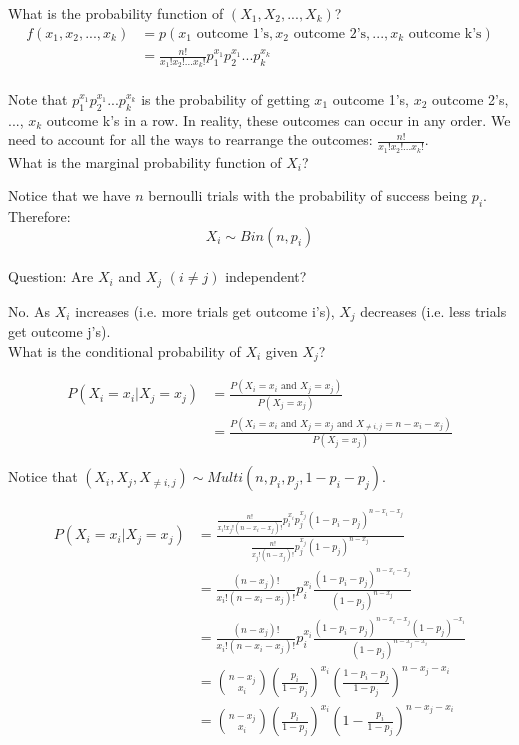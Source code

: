 \documentclass[12pt, letterpaper]{article}
\begin{document}
What is the probability function of $(X_1, X_2, ..., X_k)$?
\begin{align*}
f\left(x_1, x_2, ..., x_k\right) &= p\left(x_1 \text{ outcome 1's}, x_2 \text{ outcome 2's}, ..., x_k \text{ outcome k's}\right)\\
&= \frac{n!}{x_1! x_2! ... x_k!} p_1^{x_1} p_2^{x_1} ... p_k^{x_k}
\end{align*}\\

Note that $p_1^{x_1} p_2^{x_1} ... p_k^{x_k}$ is the probability of getting $x_1$ outcome 1's, $x_2$ outcome 2's, ..., $x_k$ outcome k's in a row. In reality, these outcomes can occur in any order. We need to account for all the ways to rearrange the outcomes: $\frac{n!}{x_1! x_2! ... x_k!}$.\\

What is the marginal probability function of $X_i$?

Notice that we have $n$ bernoulli trials with the probability of success being $p_i$. Therefore:
\begin{equation}
X_i \sim Bin(n, p_i)
\end{equation}\\

Question: Are $X_i$ and $X_j$ $(i \neq j)$ independent?

No. As $X_i$ increases (i.e. more trials get outcome i's), $X_j$ decreases (i.e. less trials get outcome j's).\\

What is the conditional probability of $X_i$ given $X_j$?

\begin{align*}
P\left(X_i = x_i \vert X_j = x_j\right) &= \frac{P\left(X_i = x_i \text{ and } X_j = x_j\right)}{P\left(X_j = x_j\right)}\\
&= \frac{P\left(X_i = x_i \text{ and } X_j = x_j \text{ and } X_{\neq i,j} = n - x_i - x_j\right)}{P\left(X_j = x_j\right)}
\end{align*}

Notice that $(X_i, X_j, X_{\neq i, j}) \sim Multi(n, p_i, p_j, 1 - p_i - p_j)$.

\begin{align*}
P\left(X_i = x_i \vert X_j = x_j\right) &= \frac{\frac{n!}{x_i!x_j!(n - x_i - x_j)!} p_i^{x_i} p_j^{x_j} (1 - p_i - p_j)^{n - x_i - x_j}}{\frac{n!}{x_j!(n - x_j)!} p_j^{x_j} (1 - p_j)^{n - x_j}}\\
&= \frac{(n - x_j)!}{x_i! (n - x_i - x_j)!} p_i^{x_i} \frac{(1 - p_i - p_j)^{n - x_i - x_j}}{(1 - p_j)^{n - x_j}}\\
&= \frac{(n - x_j)!}{x_i! (n - x_i - x_j)!} p_i^{x_i} \frac{(1 - p_i - p_j)^{n - x_i - x_j} (1 - p_j)^{-x_i}}{(1 - p_j)^{n - x_j - x_i}}\\
&= {{n - x_j} \choose {x_i}} \left(\frac{p_i}{1 - p_j}\right)^{x_i} \left(\frac{1 - p_i - p_j}{1 - p_j}\right)^{n - x_j - x_i}\\
&= {{n - x_j} \choose {x_i}} \left(\frac{p_i}{1 - p_j}\right)^{x_i} \left(1 - \frac{p_i}{1 - p_j}\right)^{n - x_j - x_i}
\end{align*}\\
\end{document}

